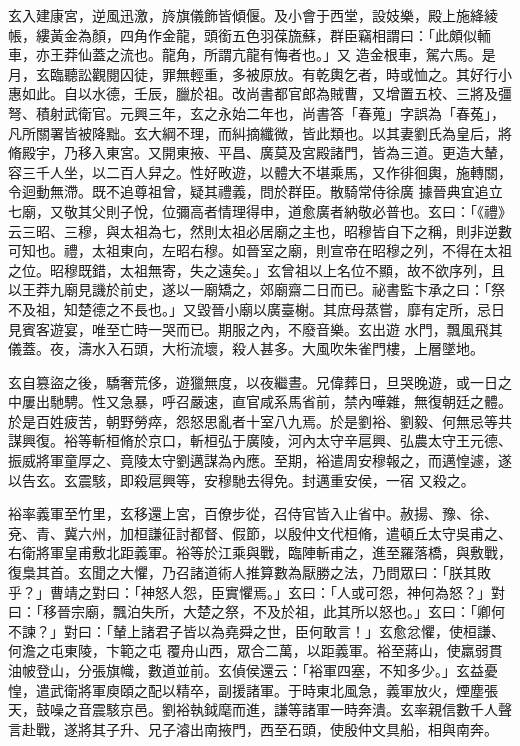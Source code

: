 \begin{pinyinscope}
 玄入建康宮，逆風迅激，旍旗儀飾皆傾偃。及小會于西堂，設妓樂，殿上施絳綾帳，縷黃金為顏，四角作金龍，頭銜五色羽葆旒蘇，群臣竊相謂曰：「此頗似輀車，亦王莽仙蓋之流也。龍角，所謂亢龍有悔者也。」又
 造金根車，駕六馬。是月，玄臨聽訟觀閱囚徒，罪無輕重，多被原放。有乾輿乞者，時或恤之。其好行小惠如此。自以水德，壬辰，臘於祖。改尚書都官郎為賊曹，又增置五校、三將及彊弩、積射武衛官。元興三年，玄之永始二年也，尚書答「春蒐」字誤為「春菟」，凡所關署皆被降黜。玄大綱不理，而糾摘纖微，皆此類也。以其妻劉氏為皇后，將脩殿宇，乃移入東宮。又開東掖、平昌、廣莫及宮殿諸門，皆為三道。更造大輦，容三千人坐，以二百人舁之。性好畋遊，以體大不堪乘馬，又作徘徊輿，施轉關，令迴動無滯。既不追尊祖曾，疑其禮義，問於群臣。散騎常侍徐廣
 據晉典宜追立七廟，又敬其父則子悅，位彌高者情理得申，道愈廣者納敬必普也。玄曰：「《禮》云三昭、三穆，與太祖為七，然則太祖必居廟之主也，昭穆皆自下之稱，則非逆數可知也。禮，太祖東向，左昭右穆。如晉室之廟，則宣帝在昭穆之列，不得在太祖之位。昭穆既錯，太祖無寄，失之遠矣。」玄曾祖以上名位不顯，故不欲序列，且以王莽九廟見譏於前史，遂以一廟矯之，郊廟齋二日而已。祕書監卞承之曰：「祭不及祖，知楚德之不長也。」又毀晉小廟以廣臺榭。其庶母蒸嘗，靡有定所，忌日見賓客遊宴，唯至亡時一哭而已。期服之內，不廢音樂。玄出遊
 水門，飄風飛其儀蓋。夜，濤水入石頭，大桁流壞，殺人甚多。大風吹朱雀門樓，上層墜地。



 玄自篡盜之後，驕奢荒侈，遊獵無度，以夜繼晝。兄偉葬日，旦哭晚遊，或一日之中屢出馳騁。性又急暴，呼召嚴速，直官咸系馬省前，禁內嘩雜，無復朝廷之體。於是百姓疲苦，朝野勞瘁，怨怒思亂者十室八九焉。於是劉裕、劉毅、何無忌等共謀興復。裕等斬桓脩於京口，斬桓弘于廣陵，河內太守辛扈興、弘農太守王元德、振威將軍童厚之、竟陵太守劉邁謀為內應。至期，裕遣周安穆報之，而邁惶遽，遂以告玄。玄震駭，即殺扈興等，安穆馳去得免。封邁重安侯，一宿
 又殺之。



 裕率義軍至竹里，玄移還上宮，百僚步從，召侍官皆入止省中。赦揚、豫、徐、兗、青、冀六州，加桓謙征討都督、假節，以殷仲文代桓脩，遣頓丘太守吳甫之、右衛將軍皇甫敷北距義軍。裕等於江乘與戰，臨陣斬甫之，進至羅落橋，與敷戰，復梟其首。玄聞之大懼，乃召諸道術人推算數為厭勝之法，乃問眾曰：「朕其敗乎？」曹靖之對曰：「神怒人怨，臣實懼焉。」玄曰：「人或可怨，神何為怒？」對曰：「移晉宗廟，飄泊失所，大楚之祭，不及於祖，此其所以怒也。」玄曰：「卿何不諫？」對曰：「輦上諸君子皆以為堯舜之世，臣何敢言！」玄愈忿懼，使桓謙、何澹之屯東陵，卞範之屯
 覆舟山西，眾合二萬，以距義軍。裕至蔣山，使羸弱貫油帔登山，分張旗幟，數道並前。玄偵侯還云：「裕軍四塞，不知多少。」玄益憂惶，遣武衛將軍庾頤之配以精卒，副援諸軍。于時東北風急，義軍放火，煙塵張天，鼓噪之音震駭京邑。劉裕執鉞麾而進，謙等諸軍一時奔潰。玄率親信數千人聲言赴戰，遂將其子升、兄子濬出南掖門，西至石頭，使殷仲文具船，相與南奔。




\end{pinyinscope}
